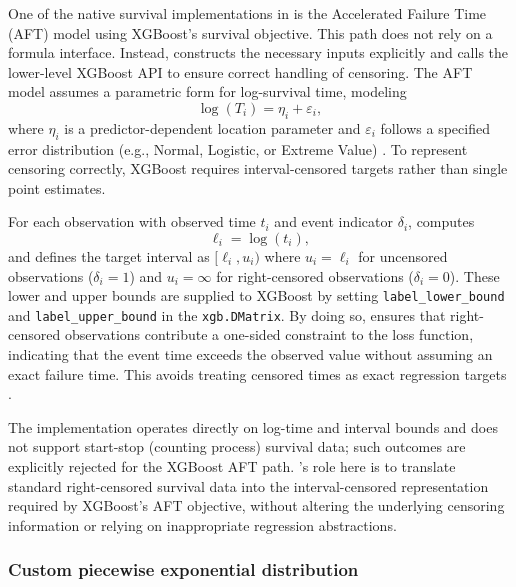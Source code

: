 One of the native survival implementations in  is the Accelerated Failure Time (AFT) model using XGBoost's survival objective. This path does not rely on a formula interface. Instead,  constructs the necessary inputs explicitly and calls the lower-level XGBoost API to ensure correct handling of censoring. The AFT model assumes a parametric form for log-survival time, modeling
\begin{equation}
  \log (T_i) = \eta_i + \varepsilon_i,
\end{equation}
where \(\eta_i\) is a predictor-dependent location parameter and \(\varepsilon_i\) follows a specified error distribution (e.g., Normal, Logistic, or Extreme Value) \citep{Kalbfleisch:2002aa}. To represent censoring correctly, XGBoost requires interval-censored targets rather than single point estimates.

For each observation with observed time \(t_i\) and event indicator \(\delta_i\),  computes
\begin{equation}
  \ell_i = \log(t_i),
\end{equation}
and defines the target interval as \([\ell_i, u_i)\) where \(u_i = \ell_i\) for uncensored observations (\(\delta_i = 1\)) and \(u_i = \infty\) for right-censored observations (\(\delta_i = 0\)). These lower and upper bounds are supplied to XGBoost by setting \texttt{label\_lower\_bound} and \texttt{label\_upper\_bound} in the \texttt{xgb.DMatrix}. By doing so,  ensures that right-censored observations contribute a one-sided constraint to the loss function, indicating that the event time exceeds the observed value without assuming an exact failure time. This avoids treating censored times as exact regression targets \citep{Barnwal:2020_arXiv}.

The implementation operates directly on log-time and interval bounds and does not support start-stop (counting process) survival data; such outcomes are explicitly rejected for the XGBoost AFT path. 's role here is to translate standard right-censored survival data into the interval-censored representation required by XGBoost's AFT objective, without altering the underlying censoring information or relying on inappropriate regression abstractions.

\subsubsection{Custom piecewise exponential distribution}\label{custom-piecewise-exponential-distribution}

